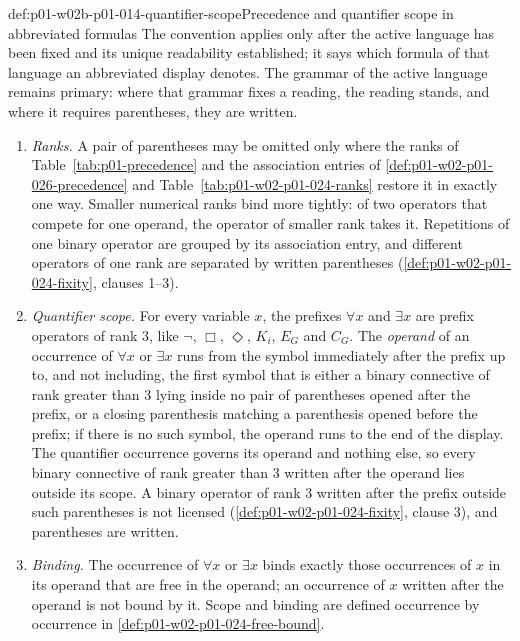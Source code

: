 \begin{hbconvention}{def:p01-w02b-p01-014-quantifier-scope}{Precedence and quantifier scope in abbreviated formulas}
The convention applies only after the active language has been fixed and
its unique readability established; it says which formula of that
language an abbreviated display denotes.  The grammar of the active
language remains primary: where that grammar fixes a reading, the reading
stands, and where it requires parentheses, they are written.
\begin{enumerate}
\item \emph{Ranks.}  A pair of parentheses may be omitted only where the
  ranks of Table~\ref{tab:p01-precedence} and the association entries of
  \cref{def:p01-w02-p01-026-precedence} and
  Table~\ref{tab:p01-w02-p01-024-ranks} restore it in exactly one way.
  Smaller numerical ranks bind more tightly: of two operators that compete
  for one operand, the operator of smaller rank takes it.  Repetitions of
  one binary operator are grouped by its association entry, and different
  operators of one rank are separated by written parentheses
  (\cref{def:p01-w02-p01-024-fixity}, clauses 1--3).
\item \emph{Quantifier scope.}  For every variable \(x\), the prefixes
  \(\forall x\) and \(\exists x\) are prefix operators of rank 3, like
  \(\neg\), \(\Box\), \(\Diamond\), \(K_i\), \(E_G\) and \(C_G\).  The
  \emph{operand} of an occurrence of \(\forall x\) or \(\exists x\) runs
  from the symbol immediately after the prefix up to, and not including,
  the first symbol that is either a binary connective of rank greater
  than 3 lying inside no pair of parentheses opened after the prefix, or a
  closing parenthesis matching a parenthesis opened before the prefix; if
  there is no such symbol, the operand runs to the end of the display.
  The quantifier occurrence governs its operand and nothing else, so
  every binary connective of rank greater than 3 written after the
  operand lies outside its scope.  A binary operator of
  rank 3 written after the prefix outside such parentheses is not
  licensed (\cref{def:p01-w02-p01-024-fixity}, clause 3), and parentheses
  are written.
\item \emph{Binding.}  The occurrence of \(\forall x\) or \(\exists x\)
  binds exactly those occurrences of \(x\) in its operand that are free in
  the operand; an occurrence of \(x\) written after the operand is not
  bound by it.  Scope and binding are defined occurrence by occurrence in
  \cref{def:p01-w02-p01-024-free-bound}.

\end{enumerate}
\end{hbconvention}
